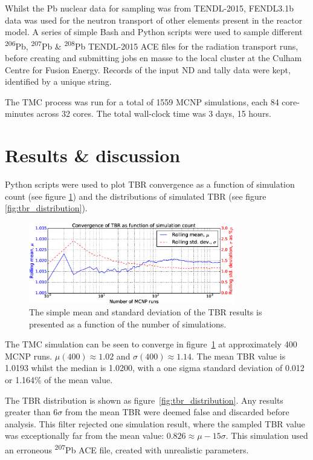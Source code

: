 Whilst the Pb nuclear data for sampling was from TENDL-2015, FENDL3.1b data was used for the neutron transport of other elements present in the reactor model. A series of simple Bash and Python scripts were used to sample different \textsuperscript{206}Pb, \textsuperscript{207}Pb \& \textsuperscript{208}Pb TENDL-2015 ACE files for the radiation transport runs, before creating and submitting jobs en masse to the local cluster at the Culham Centre for Fusion Energy. Records of the input ND and tally data were kept, identified by a unique string.

The TMC process was run for a total of 1559 MCNP simulations, each 84 core-minutes across 32 cores. The total wall-clock time was 3 days, 15 hours.

\section{Results \& discussion}
Python scripts were used to plot TBR convergence as a function of simulation count (see figure \ref{fig:convergence}) and the distributions of simulated TBR (see figure \ref{fig:tbr_distribution}).

\begin{figure}[H]
  \centering
	\includegraphics[width=0.8\textwidth]{hcll_convergence_1559}
	\caption[Convergence of TBR distribution as a function of simulation count.]{The simple mean and standard deviation of the TBR results is presented as a function of the number of simulations.}
	\label{fig:convergence}
\end{figure}

The TMC simulation can be seen to converge in figure~\ref{fig:convergence} at approximately 400 MCNP runs. $\mu(400) \approx 1.02$ and $\sigma(400) \approx 1.14$. The mean TBR value is 1.0193 whilst the median is 1.0200, with a one sigma standard deviation of 0.012 or 1.164\% of the mean value. 

The TBR distribution is shown as figure~\ref{fig:tbr_distribution}. Any results greater than 6$\sigma$ from the mean TBR were deemed false and discarded before analysis. This filter rejected one simulation result, where the sampled TBR value was exceptionally far from the mean value: $0.826 \approx \mu - 15\sigma$. This simulation used an erroneous \textsuperscript{207}Pb ACE file, created with unrealistic parameters. 

